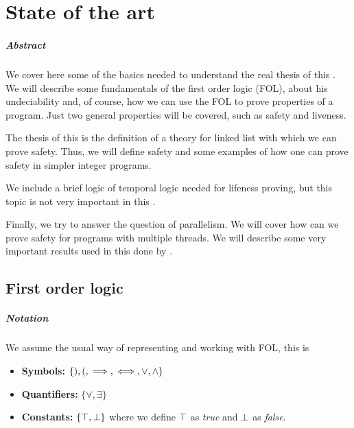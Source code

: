 \chapter{State of the art\label{sec:estado_del_arte}}

\paragraph{Abstract}

We cover here some of the basics needed to understand the real thesis of this \thisworkm. We will describe some fundamentals of the first order logic (\gls{FOL}), about his undeciability and, of course, how we can use the \gls{FOL} to prove properties of a program. Just two general properties will be covered, such as safety and liveness.

The thesis of this \thisworkm is the definition of a theory for linked list with which we can prove safety. Thus, we will define safety and some examples of how one can prove safety in simpler integer programs.

We include a brief logic of temporal logic needed for lifeness proving, but this topic is not very important in this \thisworkm.

Finally, we try to answer the question of parallelism. We will cover how can we prove safety for programs with multiple threads. We will describe some very important results used in this \thisworkm done by \citep{thesisAle}.

\section{First order logic}

\paragraph{Notation}
\label{def:notation}
We assume the usual way of representing and working with \gls{FOL}, this is
\begin{itemize}
	\item \textbf{Symbols:} $\{),(, \implies, \iff, \vee , \wedge \}$
	\item \textbf{Quantifiers:} $\{\forall, \exists\}$
	\item \textbf{Constants:} $\{\top,\perp\}$
	where we define $\top$ as \textit{true} and $\perp$ as \textit{false}.
\end{itemize}

